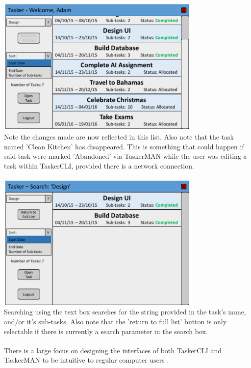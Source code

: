 \documentclass{project}
\begin{document}
\newline
\includegraphics[width=0.75\textwidth, center]{images/5.2/TaskerCLIMainScreenUpdated} \\
Note the changes made are now reflected in this list. Also note that the task named 'Clean Kitchen' has disappeared. This is something that could happen if said task were marked 'Abandoned' via TaskerMAN while the user was editing a task within TaskerCLI, provided there is a network connection. \\~\\
\newline
\includegraphics[width=0.75\textwidth, center]{images/5.2/TaskerCLIMainScreenSearch} \\
Searching using the text box searches for the string provided in the task's name, and/or it's sub-tasks. Also note that the 'return to full list' button is only selectable if there is currently a search parameter in the search box.\\~\\
\newline
There is a large focus on designing the interfaces of both TaskerCLI and TaskerMAN to be intuitive to regular computer users \cite{se.qa.rs ir1}.
\end{document}
